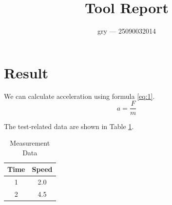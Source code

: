 \documentclass{article}
\begin{document}
\title{Tool Report}
\author{gry — 25090032014}
\maketitle

\section{Result}

We can calculate acceleration using formula \ref{eq:1}.
\begin{equation}
a=\frac{F}{m}
\label{eq:1}
\end{equation}

The test‑related data are shown in Table \ref{tab:1}.
\begin{table}[h]
\centering
\caption{Measurement Data}
\label{tab:1}
\begin{tabular}{cc}
\hline
Time & Speed \\
\hline
1 & 2.0 \\
2 & 4.5 \\
\hline
\end{tabular}
\end{table}
\end{document}
